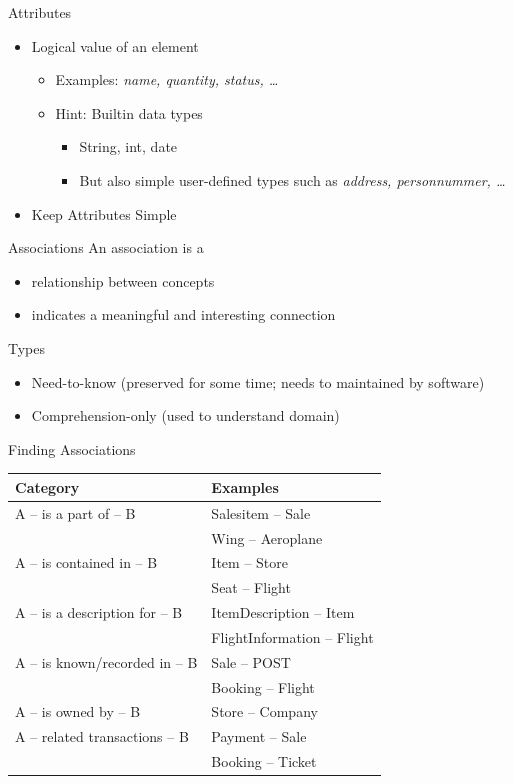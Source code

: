 \documentclass[10pt,t,a4paper]{beamer}
\begin{document}
\begin{frame}[label={sec:org19541cd}]{Attributes}
\begin{itemize}
\item Logical value of an element
\begin{itemize}
\item Examples: \emph{name, quantity, status, \ldots{}}
\item Hint: Builtin data types
\begin{itemize}
\item String, int, date
\item But also simple user-defined types such as \emph{address, personnummer, \ldots{}}
\end{itemize}
\end{itemize}
\item \alert{Keep Attributes Simple}
\end{itemize}
\end{frame}
\begin{frame}[label={sec:org18387f3}]{Associations}
An association is a
\begin{itemize}
\item relationship between concepts
\item indicates a meaningful and interesting connection
\end{itemize}

Types
\begin{itemize}
\item Need-to-know (preserved for some time; needs to maintained by software)
\item Comprehension-only (used to understand domain)
\end{itemize}
\end{frame}
\begin{frame}[label={sec:org9108201}]{Finding Associations}
\begin{center}
\begin{tabular}{ll}
Category & Examples\\
\hline
A -- is a part of -- B & Salesitem -- Sale\\
 & Wing -- Aeroplane\\
A -- is contained in -- B & Item -- Store\\
 & Seat -- Flight\\
A -- is a description for -- B & ItemDescription -- Item\\
 & FlightInformation -- Flight\\
A -- is known/recorded in -- B & Sale -- POST\\
 & Booking -- Flight\\
A -- is owned by -- B & Store -- Company\\
A -- related transactions -- B & Payment -- Sale\\
 & Booking -- Ticket\\
\hline
\end{tabular}
\end{center}
\end{frame}
\end{document}

